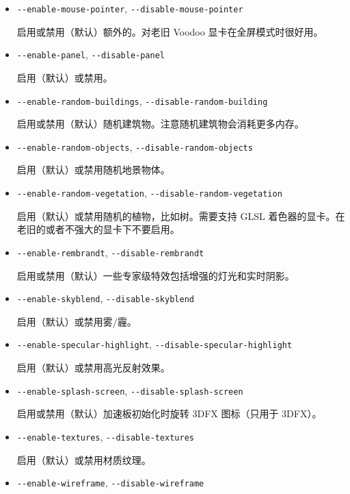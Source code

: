 {\begin{itemize}
 \item{\texttt{-$ $-enable-mouse-pointer}, \texttt{-$ $-disable-mouse-pointer}}

  启用或禁用（默认）额外的。对老旧 Voodoo 显卡在全屏模式时很好用。

\item{\texttt{-$ $-enable-panel}, \texttt{-$ $-disable-panel}}

 启用（默认）或禁用。

\item{\texttt{-$ $-enable-random-buildings}, \texttt{-$ $-disable-random-building}}

 启用或禁用（默认）随机建筑物。注意随机建筑物会消耗更多内存。

\item{\texttt{-$ $-enable-random-objects}, \texttt{-$ $-disable-random-objects}}

 启用（默认）或禁用随机地景物体。

 \item{\texttt{-$ $-enable-random-vegetation}, \texttt{-$ $-disable-random-vegetation}}

 启用（默认）或禁用随机的植物，比如树。需要支持 GLSL 着色器的显卡。在老旧的或者不强大的显卡下不要启用。

\item{\texttt{-$ $-enable-rembrandt}, \texttt{-$ $-disable-rembrandt}}

 启用或禁用（默认）一些专家级特效包括增强的灯光和实时阴影。

\item{\texttt{-$ $-enable-skyblend}, \texttt{-$ $-disable-skyblend}}

 启用（默认）或禁用雾/霾。

\item{\texttt{-$ $-enable-specular-highlight}, \texttt{-$ $-disable-specular-highlight}}

  启用（默认）或禁用高光反射效果。

\item{\texttt{-$ $-enable-splash-screen}, \texttt{-$ $-disable-splash-screen}}

  启用或禁用（默认）加速板初始化时旋转 3DFX 图标（只用于 3DFX）。

\item{\texttt{-$ $-enable-textures}, \texttt{-$ $-disable-textures}}

  启用（默认）或禁用材质纹理。

\item{\texttt{-$ $-enable-wireframe}, \texttt{-$ $-disable-wireframe}}


\end{itemize}}
